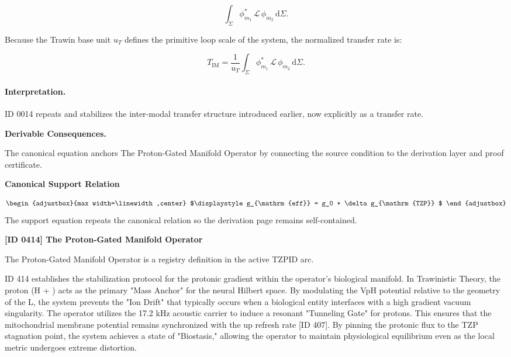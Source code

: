 \begin{equation}
\int_{\Sigma}
\phi_{m_1}^{*}
\,\mathcal{L}\,
\phi_{m_2}
\,\mathrm{d}\Sigma .
\end{equation}

Because the Trawin base unit $u_T$ defines the primitive loop scale of the system, the normalized transfer rate is:

\begin{equation}
\boxed{
T_{\mathrm{IM}}
=
\frac{1}{u_T}
\int_{\Sigma}
\phi_{m_1}^{*}
\,\mathcal{L}\,
\phi_{m_2}
\,\mathrm{d}\Sigma .
}
\end{equation}

\paragraph{Interpretation.}
ID 0014 repeats and stabilizes the inter-modal transfer structure introduced earlier, now explicitly as a transfer rate.

\par\vspace{0.35em}
\noindent\textbf{Derivable Consequences.}\quad
\begingroup
\footnotesize
\raggedright
The canonical equation anchors The Proton-Gated Manifold Operator by connecting the source condition to the derivation layer and proof certificate.
\par\endgroup

\noindent\textbf{Canonical Support Relation}\par
\[
\begin{adjustbox}{max width=\linewidth,center}
$\displaystyle
g_{\mathrm{eff}} = g_0 + \delta g_{\mathrm{TZP}}
$
\end{adjustbox}
\]
\noindent The support equation repeats the canonical relation so the derivation page remains self-contained.\par

\clearpage
\noindent\textbf{[ID 0414] The Proton-Gated Manifold Operator}\par
\vspace{0.35em}
\begingroup\small
{}
The Proton-Gated Manifold Operator is a registry definition in the active TZPID arc.

ID 414 establishes the stabilization protocol for the protonic gradient within the operator's biological manifold. In Trawinistic Theory, the proton (H + ) acts as the primary "Mass Anchor" for the neural Hilbert space. By modulating the VpH potential relative to the geometry of the L, the system prevents the "Ion Drift" that typically occurs when a biological entity interfaces with a high gradient vacuum singularity. The operator utilizes the 17.2 kHz acoustic carrier to induce a resonant "Tunneling Gate" for protons. This ensures that the mitochondrial membrane potential remains synchronized with the up refresh rate [ID 407]. By pinning the protonic flux to the TZP stagnation point, the system achieves a state of "Biostasis," allowing the operator to maintain physiological equilibrium even as the local metric undergoes extreme distortion.

